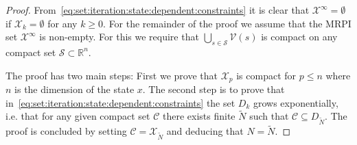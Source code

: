 \documentclass[letterpaper, 10pt, conference]{ieeeconf} %
\begin{document}
\begin{proof}
From~\eqref{eq:set:iteration:state:dependent:constraints} it is clear that $\mathcal X^\infty = \emptyset$ if $\mathcal X_k =\emptyset$ for any $k\geq 0$.
For the remainder of the proof we assume
that the MRPI set $\mathcal X^\infty$ is non-empty. For this we require that $\bigcup_{s\in\mathcal S}\mathcal V(s)$ is compact on any compact set $\mathcal S\subset\mathbb R^n$.

The proof has two main steps: First we prove that $\mathcal X_p$ is compact for $p\leq n$
where $n$ is the dimension of the state $x$. The second step is to prove that in~\eqref{eq:set:iteration:state:dependent:constraints}
the set $D_k$ grows exponentially, i.e. that for any given compact set $\mathcal C$ there exists
finite $\tilde N$ such that $\mathcal C\subseteq D_{\tilde N}$. The proof is concluded by setting 
$\mathcal C = \mathcal X_{\tilde N}$ and deducing that $N = \tilde N$. 


\end{proof}
\end{document}
